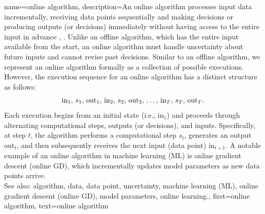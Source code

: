 {
{name={online algorithm},
	description={An online algorithm processes input data incrementally, 
		receiving data points sequentially and making decisions or producing outputs (or decisions) immediately 
		without having access to the entire input in advance \cite{PredictionLearningGames}, \cite{HazanOCO}. 
		Unlike an offline algorithm, which has the entire input available from the start, an online algorithm 
		must handle uncertainty about future inputs and cannot revise past decisions. Similar to an 
		offline algorithm, we represent an online algorithm formally as a collection of possible 
		executions. However, the execution sequence for an online algorithm has a distinct structure as follows:
		$${\rm in}_{1}, \,s_1, \,{\rm out}_{1}, \,{\rm in}_{2}, \,s_2, \,{\rm out}_{2}, \,\ldots, \,{\rm in}_{T}, \,s_T, \,{\rm out}_{T}.$$ 
		Each execution begins from an initial state (i.e., \(\text{in}_{1}\)) and proceeds through alternating 
		computational steps, outputs (or decisions), and inputs. Specifically, at step \(t\), 
		the algorithm performs a computational step \(s_{t}\), generates an output \(\text{out}_{t}\), 
		and then subsequently receives the next input (data point) \(\text{in}_{t+1}\). A 
		notable example of an online algorithm in machine learning (ML) is online gradient descent (online GD), which incrementally 
		updates model parameters as new data points arrive. 
					\\ 
		See also: algorithm, data, data point, uncertainty, machine learning (ML), online gradient descent (online GD), model parameters, online learning.},
	first={online algorithm},
	text={online algorithm} 
}


}
